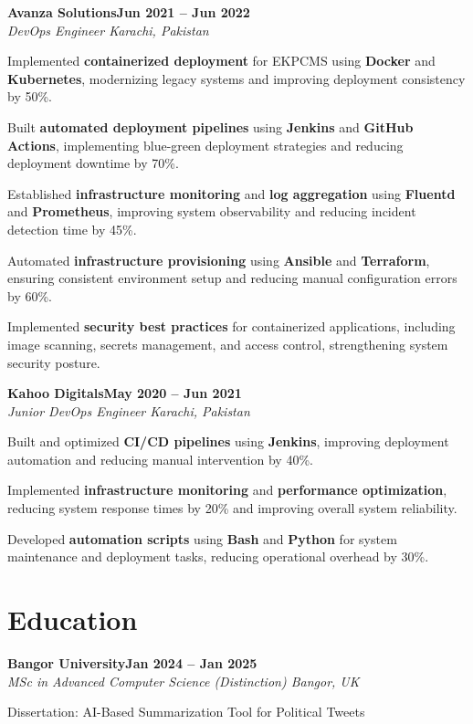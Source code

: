 \documentclass[letterpaper,10pt]{article}
\newcommand{\headingBf}[2]{
  \hspace{10pt}\textbf{#1}\hfill\textbf{#2}\\
}
\newcommand{\headingIt}[2]{
  \hspace{10pt}\textit{#1}\hfill\textit{#2}\\
}
\newenvironment{resume_list}{
  \vspace{-7pt}
  \begin{itemize}[itemsep=-2px, parsep=1pt, leftmargin=30pt]
}{
  \end{itemize}
}
\begin{document}
\headingBf{Avanza Solutions}{Jun 2021 -- Jun 2022}
\headingIt{DevOps Engineer \hfill Karachi, Pakistan}{}
\begin{resume_list}
    \item Implemented \textbf{containerized deployment} for EKPCMS using \textbf{Docker} and \textbf{Kubernetes}, modernizing legacy systems and improving deployment consistency by 50\%.
    \item Built \textbf{automated deployment pipelines} using \textbf{Jenkins} and \textbf{GitHub Actions}, implementing blue-green deployment strategies and reducing deployment downtime by 70\%.
    \item Established \textbf{infrastructure monitoring} and \textbf{log aggregation} using \textbf{Fluentd} and \textbf{Prometheus}, improving system observability and reducing incident detection time by 45\%.
    \item Automated \textbf{infrastructure provisioning} using \textbf{Ansible} and \textbf{Terraform}, ensuring consistent environment setup and reducing manual configuration errors by 60\%.
    \item Implemented \textbf{security best practices} for containerized applications, including image scanning, secrets management, and access control, strengthening system security posture.
\end{resume_list}

\headingBf{Kahoo Digitals}{May 2020 -- Jun 2021}
\headingIt{Junior DevOps Engineer \hfill Karachi, Pakistan}{}
\begin{resume_list}
    \item Built and optimized \textbf{CI/CD pipelines} using \textbf{Jenkins}, improving deployment automation and reducing manual intervention by 40\%.
    \item Implemented \textbf{infrastructure monitoring} and \textbf{performance optimization}, reducing system response times by 20\% and improving overall system reliability.
    \item Developed \textbf{automation scripts} using \textbf{Bash} and \textbf{Python} for system maintenance and deployment tasks, reducing operational overhead by 30\%.
\end{resume_list}

\section{Education}

\headingBf{Bangor University}{Jan 2024 -- Jan 2025}
\headingIt{MSc in Advanced Computer Science (Distinction) \hfill Bangor, UK}{}
\begin{resume_list}
    \item Dissertation: AI-Based Summarization Tool for Political Tweets
\end{resume_list}
\end{document}
